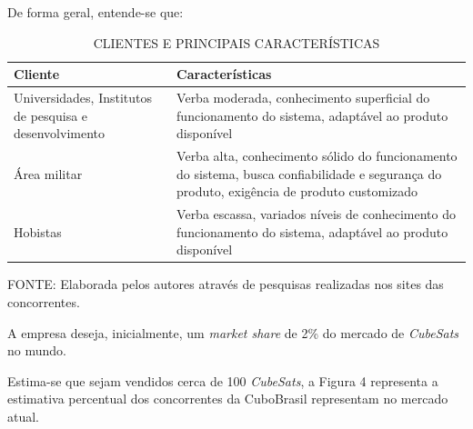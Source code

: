 \documentclass[
	12pt,				%
	openright,			%
	oneside,			%
	a4paper,			%
	english,			%
	french,				%
	spanish,			%
	brazil				%
	]{abntex2}
\begin{document}
	De forma geral, entende-se que:
	
	\begin{table} [th]
	\caption{CLIENTES E PRINCIPAIS CARACTERÍSTICAS}
	\centering
	\begin{tabular}{p{6cm}|p{6cm}}

		\textbf{Cliente} & \textbf{Características}\\
		\hline
		Universidades, Institutos de pesquisa e desenvolvimento & Verba moderada, conhecimento superficial do funcionamento do sistema, adaptável ao produto disponível\\
		\hline
		Área militar & Verba alta, conhecimento sólido do funcionamento do sistema, busca confiabilidade e segurança do produto, exigência de produto customizado\\
		\hline
		Hobistas & Verba escassa, variados níveis de conhecimento do funcionamento do sistema, adaptável ao produto disponível\\
		\hline
			
	\end{tabular}
	
	\begin{small}
		FONTE: Elaborada pelos autores através de pesquisas realizadas nos sites das concorrentes.
	\end{small}	
	\end{table}		
	\pagebreak
	A empresa deseja, inicialmente, um \textit{market share} de 2\% do mercado de \textit{CubeSats} no mundo.
	 
 	Estima-se que sejam vendidos cerca de 100 \textit{CubeSats}, a Figura 4 representa a estimativa percentual dos concorrentes da CuboBrasil representam no mercado atual. 
 	
\end{document}
